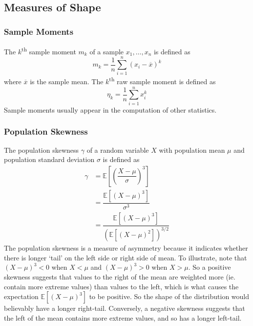 \documentclass[11pt]{report} %
\begin{document}
\subsection{Measures of Shape}

\subsubsection{Sample Moments}

The $k$\textsuperscript{th} sample moment $m_{k}$ of a sample $x_{1}, \dots, x_{n}$ is defined as
\begin{equation}
m_{k} = \dfrac{1}{n}\sum_{i = 1}^{n}\left(x_{i} - \overline{x}\right)^{k}
\end{equation}
where $\overline{x}$ is the sample mean. The $k$\textsuperscript{th} raw sample moment is defined as
\begin{equation}
\eta_{k} = \dfrac{1}{n}\sum_{i = 1}^{n}x_{i}^{k}
\end{equation}
Sample moments usually appear in the computation of other statistics. 

\subsubsection{Population Skewness}

The population skewness $\gamma$ of a random variable $X$ with population mean $\mu$ and population standard deviation $\sigma$ is defined as
\begin{align}
\gamma &= \mathbb{E}\left[\left(\dfrac{X - \mu}{\sigma}\right)^{3}\right] \\
&= \dfrac{\mathbb{E}\left[\left(X - \mu\right)^{3}\right]}{\sigma^{3}} \\
&= \dfrac{\mathbb{E}\left[\left(X - \mu\right)^{3}\right]}{\left(\mathbb{E}\left[\left(X - \mu\right)^{2}\right]\right)^{3/2}}
\end{align}
The population skewness is a measure of asymmetry because it indicates whether there is longer `tail' on the left side or right side of mean. To illustrate, note that $\left(X - \mu\right)^{3} < 0$ when $X < \mu$ and $\left(X - \mu\right)^{3} > 0$ when $X > \mu$. So a positive skewness suggests that values to the right of the mean are weighted more (ie. contain more extreme values) than values to the left, which is what causes the expectation $\mathbb{E}\left[\left(X - \mu\right)^{3}\right]$ to be positive. So the shape of the distribution would believably have a longer right-tail. Conversely, a negative skewness suggests that the left of the mean contains more extreme values, and so has a longer left-tail.
\end{document}
